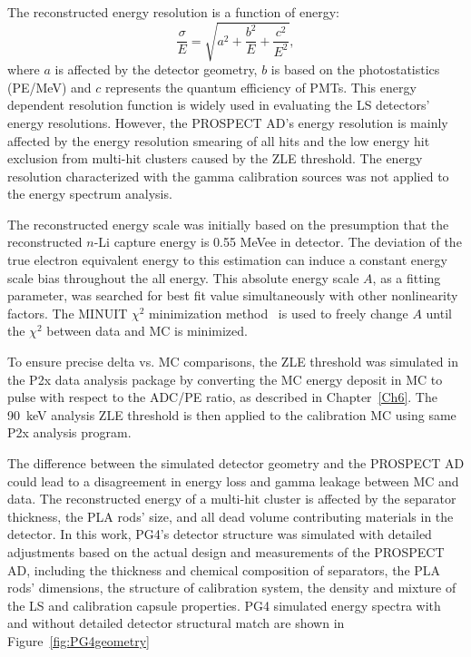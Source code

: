 \label{sec:resolution}
The reconstructed energy resolution is a function of energy:
\begin{equation}
\label{eql:resolution}
    \frac{\sigma}{E} = \sqrt{a^2 + \frac{b^2}{E}+\frac{c^2}{E^2}},
\end{equation}
where $a$ is affected by the detector geometry, $b$ is based on the photostatistics (PE/MeV) and $c$ represents the quantum efficiency of PMTs.
This energy dependent resolution function is widely used in evaluating the LS detectors' energy resolutions.
However, the PROSPECT AD's energy resolution is mainly affected by the energy resolution smearing of all hits and the low energy hit exclusion from multi-hit clusters caused by the ZLE threshold. 
The energy resolution characterized with the gamma calibration sources was not applied to the energy spectrum analysis.

\label{sec:other}
The reconstructed energy scale was initially based on the presumption that the reconstructed $n$-Li capture energy is 0.55 MeVee in detector. 
The deviation of the true electron equivalent energy to this estimation can induce a constant energy scale bias throughout the all energy. 
This absolute energy scale $A$, as a fitting parameter, was searched for best fit value simultaneously with other nonlinearity factors. 
The MINUIT $\chi^2$ minimization method~\cite{bib:minuit} is used to freely change $A$ until the $\chi^2$ between data and MC is minimized.

To ensure precise delta vs. MC comparisons, the ZLE threshold was simulated in the P2x data analysis package by converting the MC energy deposit in MC to pulse with respect to the ADC/PE ratio, as described in Chapter~\ref{Ch6}.
The 90~keV analysis ZLE threshold is then applied to the calibration MC using same P2x analysis program.

The difference between the simulated detector geometry and the PROSPECT AD could lead to a disagreement in energy loss and gamma leakage between MC and data. 
The reconstructed energy of a multi-hit cluster is affected by the separator thickness, the PLA rods' size, and all dead volume contributing materials in the detector.
In this work, PG4's detector structure was simulated with detailed adjustments based on the actual design and measurements of the PROSPECT AD, including the thickness and chemical composition of separators, the PLA rods' dimensions, the structure of calibration system, the density and mixture of the LS and calibration capsule properties. 
PG4 simulated energy spectra with and without detailed detector structural match are shown in Figure~\ref{fig:PG4geometry}

